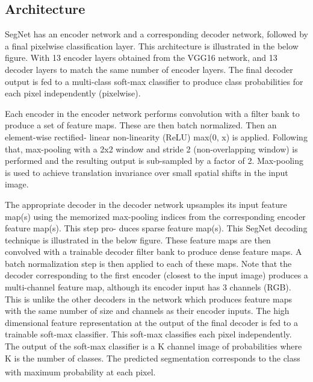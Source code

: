 \subsection{Architecture}
SegNet has an encoder network and a corresponding decoder network, followed by a final pixelwise classification layer. This architecture is illustrated in the below figure.
With 13 encoder layers obtained from the VGG16 network, and 13 decoder layers to match the same number of encoder layers. The final decoder output is fed to a multi-class soft-max classifier to produce class probabilities for each pixel independently (pixelwise).

Each encoder in the encoder network performs convolution with a filter bank to produce a set of feature maps. These are then batch normalized. Then an element-wise rectified- linear non-linearity (ReLU) max(0, x) is applied. Following that, max-pooling with a 2x2 window and stride 2 (non-overlapping window) is performed and the resulting output is sub-sampled by a factor of 2. Max-pooling is used to achieve translation invariance over small spatial shifts in the input image.

The appropriate decoder in the decoder network upsamples its input feature map(s) using the memorized max-pooling indices from the corresponding encoder feature map(s). This step pro- duces sparse feature map(s). This SegNet decoding technique is illustrated in the below figure.
These feature maps are then convolved with a trainable decoder filter bank to produce dense feature maps. A batch normalization step is then applied to each of these maps. Note that the decoder corresponding to the first encoder (closest to the input image) produces a multi-channel feature map, although its encoder input has 3 channels (RGB).
This is unlike the other decoders in the network which produces feature maps with the same number of size and channels as their encoder inputs. The high dimensional feature representation at the output of the final decoder is fed to a trainable soft-max classifier.
This soft-max classifies each pixel independently. The output of the soft-max classifier is a K channel image of probabilities where K is the number of classes. The predicted segmentation corresponds to the class with maximum probability at each pixel. \textsuperscript{\cite{badrinarayanan2017segnet}}

\vspace{0.2in}

